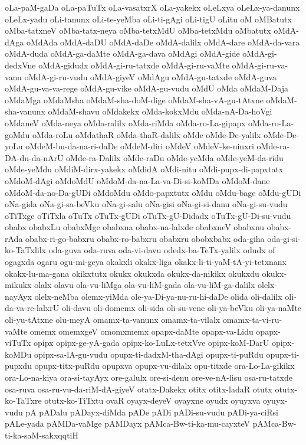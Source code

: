 {oLa-paM-gaDa
oLa-paTuTx
oLa-vasatxrX
oLa-yakekx
oLeLxya
oLeLx-ya-danunx
oLeLx-yadu
oLi-tanunx
oLi-te-yeMba
oLi-ti-gAgi
oLi-tigU
oLitu
oM
oMBatutx
oMba-tatxneV
oMba-tatx-neya
oMba-tetxMdU
oMba-tetxMdu
oMbatutx
oMdA-dAga
oMdAda
oMdA-daDU
oMdA-daDe
oMdA-dalilx
oMdA-dare
oMdA-da-vara
oMdA-duda
oMdA-ga-daMte
oMdA-ga-dava
oMdAgi
oMdA-gide
oMdA-gi-dedxVne
oMdA-gidudx
oMdA-gi-ru-tatxde
oMdA-gi-ru-vaMte
oMdA-gi-ru-va-vanu
oMdA-gi-ru-vudu
oMdA-giyeV
oMdAgu
oMdA-gu-tatxde
oMdA-guva
oMdA-gu-va-va-rege
oMdA-gu-vike
oMdA-gu-vudu
oMdU
oMda
oMdaM-Daja
oMdaMga
oMdaMsha
oMdaM-sha-doM-dige
oMdaM-sha-vA-gu-tAtxne
oMdaM-sha-vanunx
oMdaM-shavu
oMdakekx
oMda-kokxMdu
oMda-nA-Da-hoVgi
oMdaneV
oMda-neya
oMda-ralilx
oMda-riMda
oMda-ro-La-gipapx
oMda-ro-La-goMdu
oMda-roLu
oMdathaR
oMda-thaR-dalilx
oMde
oMde-De-yalilx
oMde-De-yoLu
oMdeM-bu-da-na-ri-daDe
oMdeM-diri
oMdeV
oMdeV-ke-ninxri
oMde-ra-DA-du-da-nArU
oMde-ra-Dalilx
oMde-raDu
oMde-yeMda
oMde-yeM-da-ridu
oMde-yeMdu
oMdiM-dirx-yakekx
oMdidA
oMdi-nitu
oMdi-pupx-di-papxtatx
oMdoM-dAgi
oMdoMdU
oMdoM-da-na-La-va-Di-si-koMDa
oMdoM-dane
oMdoM-da-no-Da-gUDi
oMdoMdu
oMdo-papxtutx
oMdu
oMdu-bage
oMdu-gUDi
oNa-gida
oNa-gi-sa-beVku
oNa-gi-salu
oNa-gisi
oNa-gi-si-danu
oNa-gi-su-vudu
oTiTxge
oTiTxla
oTuTx
oTuTx-gUDi
oTuTx-gU-Didadx
oTuTx-gU-Di-su-vudu
obabx
obabxLu
obabxMge
obabxna
obabx-na-lalxde
obabxneV
obabxnu
obabx-rAda
obabx-ri-go-babxru
obabx-ro-babxru
obabxru
obobxbabx
oda-giha
oda-gi-si-ko-TaTxlilx
oda-guva
oda-ruva
oda-vi-davu
odedx-ba-TeTx-yalilx
odudx
of
ogagxda
ogaru
ogu-mi-geya
okakxli
okakx-liga
okakx-li-ti-yaM-tA-yi-tetxnanx
okakx-lu-ma-gana
okikxtutx
okukx
okukxda
okukx-da-nikikx
okukxdu
okukx-mikukx
olalx
olavu
ola-vu-liMga
ola-vu-liM-gada
ola-vu-liM-ga-dalilx
olelx-nayAyx
olelx-neMba
olemx-yiMda
ole-ya-Di-ya-nu-ru-hi-daDe
olida
oli-dalilx
oli-da-va-re-lalxrU
oli-davu
oli-domemx
oli-sida
oli-su-vene
oli-ya-beVku
oli-ya-naMte
oli-yu-tAtxne
olu-meyA
omamx-ta-vanunx
omamx-ta-vilalx
omamx-ta-vi-ru-vaMte
omemx
omemxgeV
omomxmemx
opapx-daMte
opapx-va-Lidu
opapx-viTuTx
opipx
opipx-ge-yA-gada
opipx-ko-LuLx-tetxVve
opipx-koM-DarU
opipx-koMDu
opipx-sa-lA-gu-vudu
opupx-ti-dadxM-tha-dAgi
opupx-ti-puRdu
opupx-ti-pupxdu
opupx-titx-puRdu
opupxva
opupx-vu-dilalx
opu-titxde
ora-Lo-La-gikikx
ora-Lo-na-kiya
ora-si-tayAyx
ore-galulx
ore-si-denu
ore-ve-nA-lisu
osa-ru-tatxde
osa-ruva
osa-ru-vu-da-riM-dA-giyeV
otatx-Dakekx
otitx
otitx-ladaR
otutx
otutx-ko-TaTxre
otutx-ko-TiTxtu
ovaR
oyayx-deyeV
oyayxne
oyudx
oyuyxva
oyuyx-vudu
pA
pADalu
pADayx-diMda
pADe
pADi
pADi-su-vudu
pADi-ya-ciRsi
pALe-yada
pAMDa-vaMge
pAMDayx
pAMca-Bw-ti-ka-mu-cayxteV
pAMca-Bw-ti-ka-saM-sakxqqtiH
}
